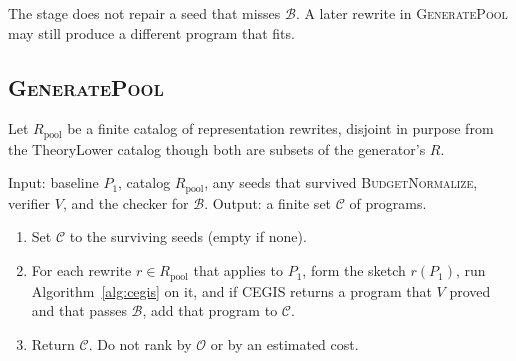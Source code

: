 The stage does not repair a seed that misses \(\mathcal{B}\). A later
rewrite in \textsc{GeneratePool} may still produce a different program that
fits.

\subsection{\textsc{GeneratePool}}

Let \(R_{\mathrm{pool}}\) be a finite catalog of representation rewrites,
disjoint in purpose from the TheoryLower catalog though both are subsets of
the generator's \(R\).

\begin{algo}
\label{alg:generatepool}
Input: baseline \(P_1\), catalog \(R_{\mathrm{pool}}\), any seeds that
survived \textsc{BudgetNormalize}, verifier \(V\), and the checker for
\(\mathcal{B}\).
Output: a finite set \(\mathcal{C}\) of programs.
\begin{enumerate}
  \item Set \(\mathcal{C}\) to the surviving seeds (empty if none).
  \item For each rewrite \(r \in R_{\mathrm{pool}}\) that applies to
  \(P_1\), form the sketch \(r(P_1)\), run
  Algorithm~\ref{alg:cegis} on it, and if CEGIS returns a program that
  \(V\) proved and that passes \(\mathcal{B}\), add that program to
  \(\mathcal{C}\).
  \item Return \(\mathcal{C}\). Do not rank by \(\mathcal{O}\) or by an
  estimated cost.
\end{enumerate}
\end{algo}

